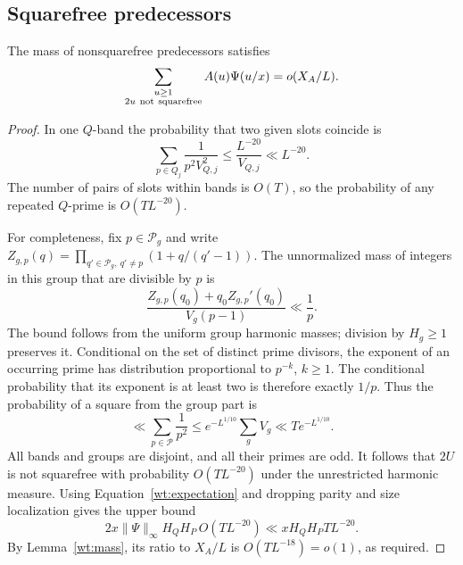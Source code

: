 \subsection{Squarefree predecessors}

\begin{lemma}\label{wt:squarefree}
The mass of nonsquarefree predecessors satisfies
\[
 \sum_{\substack{u\ge1\\2u\ {\rm not\ squarefree}}}
       A(u)\Psi(u/x)=o(X_A/L).
\]
\end{lemma}

\begin{proof}
In one $Q$-band the probability that two given slots coincide is
\[
 \sum_{p\in Q_j}\frac1{p^2V_{Q,j}^2}
 \le\frac{L^{-20}}{V_{Q,j}}\ll L^{-20}.
\]
The number of pairs of slots within bands is $O(T)$, so the
probability of any repeated $Q$-prime is $O(TL^{-20})$.

For completeness, fix $p\in\mathcal P_g$ and write
$Z_{g,p}(q)=\prod_{q'\in\mathcal P_g,\ q'\ne p}
(1+q/(q'-1))$. The unnormalized mass of integers in this group that
are divisible by $p$ is
\[
 \frac{Z_{g,p}(q_0)+q_0Z_{g,p}'(q_0)}{V_g(p-1)}\ll\frac1p.
\]
The bound follows from the uniform group harmonic masses; division
by $H_g\ge1$ preserves it. Conditional on the set of distinct prime
divisors, the exponent of an occurring prime has distribution
proportional to $p^{-k}$, $k\ge1$. The conditional probability that
its exponent is at least two is therefore exactly $1/p$.
Thus the probability of a square from the group part is
\[
 \ll\sum_{p\in\mathcal P}\frac1{p^2}
 \le e^{-L^{1/10}}\sum_gV_g
 \ll T e^{-L^{1/10}}.
\]
All bands and groups are disjoint, and all their primes are odd.
It follows that $2U$ is not squarefree with probability
$O(TL^{-20})$ under the unrestricted harmonic measure.
Using Equation~\eqref{wt:expectation} and dropping parity and size
localization gives the upper bound
\[
 2x\|\Psi\|_\infty H_QH_P\,O(TL^{-20})
   \ll xH_QH_PT L^{-20}.
\]
By Lemma~\ref{wt:mass}, its ratio to $X_A/L$ is
$O(TL^{-18})=o(1)$, as required.
\end{proof}
